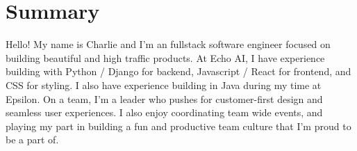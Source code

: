 \documentclass[letterpaper,11pt]{article}
\begin{document}



\section{Summary}
    {
        Hello! My name is Charlie and I'm an fullstack software engineer focused on building beautiful and high traffic products.
        At Echo AI, I have experience building with Python / Django for backend, Javascript / React for frontend, and CSS for styling.
        I also have experience building in Java during my time at Epsilon.
        On a team, I'm a leader who pushes for customer-first design and seamless user experiences.
        I also enjoy coordinating team wide events, and playing my part in building a fun and productive team culture that I'm proud to be a part of.
    }

\end{document}
